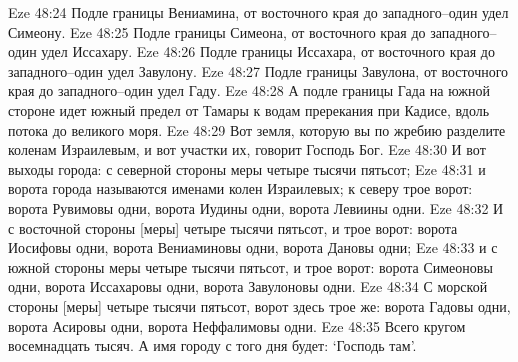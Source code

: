 Eze 48:24  Подле границы Вениамина, от восточного края до западного--один удел Симеону.
Eze 48:25  Подле границы Симеона, от восточного края до западного--один удел Иссахару.
Eze 48:26  Подле границы Иссахара, от восточного края до западного--один удел Завулону.
Eze 48:27  Подле границы Завулона, от восточного края до западного--один удел Гаду.
Eze 48:28  А подле границы Гада на южной стороне идет южный предел от Тамары к водам пререкания при Кадисе, вдоль потока до великого моря.
Eze 48:29  Вот земля, которую вы по жребию разделите коленам Израилевым, и вот участки их, говорит Господь Бог.
Eze 48:30  И вот выходы города: с северной стороны меры четыре тысячи пятьсот;
Eze 48:31  и ворота города называются именами колен Израилевых; к северу трое ворот: ворота Рувимовы одни, ворота Иудины одни, ворота Левиины одни.
Eze 48:32  И с восточной стороны [меры] четыре тысячи пятьсот, и трое ворот: ворота Иосифовы одни, ворота Вениаминовы одни, ворота Дановы одни;
Eze 48:33  и с южной стороны меры четыре тысячи пятьсот, и трое ворот: ворота Симеоновы одни, ворота Иссахаровы одни, ворота Завулоновы одни.
Eze 48:34  С морской стороны [меры] четыре тысячи пятьсот, ворот здесь трое же: ворота Гадовы одни, ворота Асировы одни, ворота Неффалимовы одни.
Eze 48:35  Всего кругом восемнадцать тысяч. А имя городу с того дня будет: `Господь там'.



